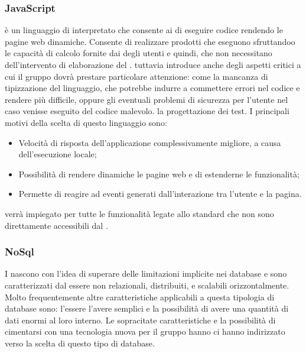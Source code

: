 \documentclass[12pt,a4paper]{article}
\begin{document}
\subsubsection{JavaScript}\label{javascript}
 è un linguaggio di  interpretato che consente ai  di eseguire codice rendendo le pagine web dinamiche. Consente di realizzare prodotti  che eseguono sfruttandoo le capacità di calcolo fornite dai  degli utenti e quindi, che non necessitano dell’intervento di elaborazione del .  tuttavia introduce anche degli aspetti critici a cui il gruppo dovrà prestare particolare attenzione: come la mancanza di tipizzazione del linguaggio, che potrebbe indurre a commettere errori nel codice e rendere più difficile, oppure gli eventuali problemi di sicurezza per l'utente nel caso venisse eseguito del codice malevolo.
la progettazione dei test.
I principali motivi della scelta di questo linguaggio sono:
\begin{itemize}
	\item Velocità di risposta dell’applicazione complessivamente migliore, a causa dell’esecuzione locale;
	\item Possibilità di rendere dinamiche le pagine web e di estenderne le funzionalità;
	\item Permette di reagire ad eventi generati dall’interazione tra l’utente e la pagina.
\end{itemize}
 verrà impiegato per tutte le funzionalità legate allo standard  che non sono direttamente accessibili dal  .



\subsubsection{NoSql}\label{nosql}
I   nascono con l'idea di superare delle limitazioni implicite nei database  e sono caratterizzati dal essere non relazionali, distribuiti,  e scalabili orizzontalmente.
Molto frequentemente altre caratteristiche applicabili a questa tipologia di database sono: l'essere  l'avere  semplici e la possibilità di avere una quantità di dati enormi al loro interno.
Le sopracitate caratteristiche e la possibilità di cimentarsi con una tecnologia nuova per il gruppo hanno ci hanno indirizzato verso la scelta di questo tipo di database.
\end{document}
